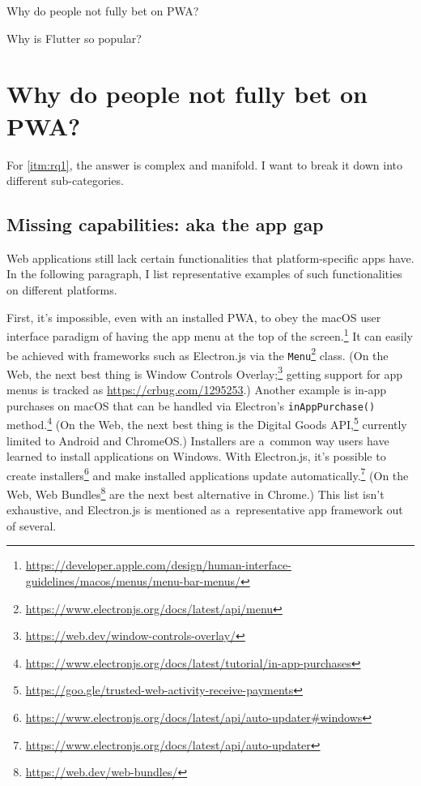 \documentclass[sigconf]{acmart}
\begin{document}
\begin{questions}
    \item Why do people not fully bet on PWA?\label{itm:rq1}
    \item Why is Flutter so popular?\label{itm:rq2}    
\end{questions}

\section{Why do people not fully bet on PWA?}

For \ref{itm:rq1}, the answer is complex and manifold. I want to break it down into different sub-categories.

\subsection{Missing capabilities: aka the app gap}

Web applications still lack certain functionalities that platform-specific apps have. In the following paragraph, I list representative examples of such functionalities on different platforms.

First, it's impossible, even with an installed PWA, to obey the macOS user interface paradigm of having the app menu at the top of the screen.\footnote{\url{https://developer.apple.com/design/human-interface-guidelines/macos/menus/menu-bar-menus/}} It can easily be achieved with frameworks such as Electron.js via the \texttt{Menu}\footnote{\url{https://www.electronjs.org/docs/latest/api/menu}} class. (On the Web, the next best thing is Window Controls Overlay;\footnote{\url{https://web.dev/window-controls-overlay/}} getting support for app menus is tracked as \url{https://crbug.com/1295253}.) Another example is in-app purchases on macOS that can be handled via Electron's \texttt{inAppPurchase()} method.\footnote{\url{https://www.electronjs.org/docs/latest/tutorial/in-app-purchases}} (On the Web, the next best thing is the Digital Goods API,\footnote{\url{https://goo.gle/trusted-web-activity-receive-payments}} currently limited to Android and ChromeOS.) Installers are a~common way users have learned to install applications on Windows. With Electron.js, it's possible to create installers\footnote{\url{https://www.electronjs.org/docs/latest/api/auto-updater\#windows}} and make installed applications update automatically.\footnote{\url{https://www.electronjs.org/docs/latest/api/auto-updater}} (On the Web, Web Bundles\footnote{\url{https://web.dev/web-bundles/}} are the next best alternative in Chrome.) This list isn't exhaustive, and Electron.js is mentioned as a~representative app framework out of several.
\end{document}
